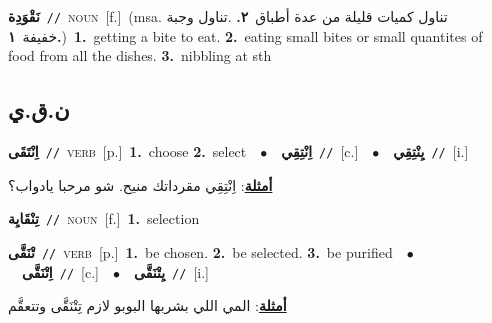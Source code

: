 \documentclass[10pt,a4paper,twoside]{article} %
\begin{document}
\begin{multicols}{2}
{\setlength\topsep{0pt}\textbf{\foreignlanguage{arabic}{نَقْوَدِة}}\ {\color{gray}\texttt{//}\color{black}}\ \textsc{noun}\ [f.]\ \color{gray}(msa. \foreignlanguage{arabic}{تناول كميات قليلة من عدة أطباق}~\foreignlanguage{arabic}{\textbf{٢.}}  .\foreignlanguage{arabic}{تناول وجبة خفيفة}~\foreignlanguage{arabic}{\textbf{١.}})\color{black}\ \textbf{1.}~getting a bite to eat.  \textbf{2.}~eating small bites or small quantites of food from all the dishes.  \textbf{3.}~nibbling at sth\ } \vspace{2mm}

\vspace{-3mm}
\subsection*{\color{blue}\foreignlanguage{arabic}{ن.ق.ي}\color{blue}{}} 

{\setlength\topsep{0pt}\textbf{\foreignlanguage{arabic}{اِنْتَقَى}}\ {\color{gray}\texttt{//}\color{black}}\ \textsc{verb}\ [p.]\ \textbf{1.}~choose  \textbf{2.}~select\ \ $\bullet$\ \ \setlength\topsep{0pt}\textbf{\foreignlanguage{arabic}{اِنْتِقِي}}\ {\color{gray}\texttt{//}\color{black}}\ [c.]\ \ $\bullet$\ \ \setlength\topsep{0pt}\textbf{\foreignlanguage{arabic}{يِنْتِقِي}}\ {\color{gray}\texttt{//}\color{black}}\ [i.]\  \begin{flushright}\color{gray}\foreignlanguage{arabic}{\textbf{\underline{\foreignlanguage{arabic}{أمثلة}}}: اِنْتِقِي مقرداتك منيح. شو مرحبا يادواب؟}\end{flushright}\color{black}} \vspace{2mm}

{\setlength\topsep{0pt}\textbf{\foreignlanguage{arabic}{تِنْقَايِة}}\ {\color{gray}\texttt{//}\color{black}}\ \textsc{noun}\ [f.]\ \textbf{1.}~selection\ } \vspace{2mm}

{\setlength\topsep{0pt}\textbf{\foreignlanguage{arabic}{تْنَقَّى}}\ {\color{gray}\texttt{//}\color{black}}\ \textsc{verb}\ [p.]\ \textbf{1.}~be chosen.  \textbf{2.}~be selected.  \textbf{3.}~be purified\ \ $\bullet$\ \ \setlength\topsep{0pt}\textbf{\foreignlanguage{arabic}{اِتْنَقَّى}}\ {\color{gray}\texttt{//}\color{black}}\ [c.]\ \ $\bullet$\ \ \setlength\topsep{0pt}\textbf{\foreignlanguage{arabic}{يِتْنَقَّى}}\ {\color{gray}\texttt{//}\color{black}}\ [i.]\  \begin{flushright}\color{gray}\foreignlanguage{arabic}{\textbf{\underline{\foreignlanguage{arabic}{أمثلة}}}: المي اللي بشربها البوبو لازم تِتْنَقَّى وتتعقَّم}\end{flushright}\color{black}} \vspace{2mm}


\end{multicols}
\end{document}
